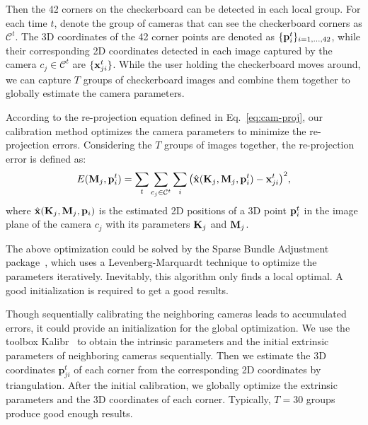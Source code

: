 %
Then the 42 corners on the checkerboard can be detected in each local group.
%
For each time $t$, denote the group of cameras that can see the checkerboard corners as $\mathcal{C}^t$. The 3D coordinates of the 42 corner points are denoted as $\{\mathbf{p}^{t}_{i}\}_{i=1,\ldots, 42}$, while their corresponding 2D coordinates detected in each image captured by the camera $c_j \in \mathcal{C}^{t}$ are $\{\mathbf{x}^{t}_{ji}\}$.
%
While the user holding the checkerboard moves around, we can capture $T$ groups of checkerboard images and combine them together to globally estimate the camera parameters.
%


According to the re-projection equation defined in Eq.~\ref{eq:cam-proj}, our calibration method optimizes the camera parameters to minimize the re-projection errors. Considering the $T$ groups of images together, the re-projection error is defined as:
%
\begin{equation} \label{eq:global-proj-error}
E(\mathbf{M}_{j},\mathbf{p}^{t}_{i})=\sum_{t}\sum_{c_j\in \mathcal{C}^{t}}\sum_{i} \big( \hat{\mathbf{x}}(\mathbf{K}_{j},\mathbf{M}_{j}, \mathbf{p}^{t}_{i})-\mathbf{x}^{t}_{ji} \big)^{2},
\end{equation}
%
where $\hat{\mathbf{x}}(\mathbf{K}_{j},\mathbf{M}_{j}, \mathbf{p}_{i})$ is the estimated 2D positions of a 3D point $\mathbf{p}^{t}_{i}$ in the image plane of the camera $c_j$ with its parameters $\mathbf{K}_j$ and $\mathbf{M}_j$.


The above optimization could be solved by the Sparse Bundle Adjustment package~\cite{lour09}, which uses a Levenberg-Marquardt technique to optimize the parameters iteratively.
Inevitably, this algorithm only finds a local optimal.
A good initialization is required to get a good results.


Though sequentially calibrating the neighboring cameras leads to accumulated errors, it could provide an initialization for the global optimization.
%
We use the toolbox Kalibr~\cite{Maye2013Self} to obtain the intrinsic parameters and the initial extrinsic parameters of neighboring cameras sequentially.
%
Then we estimate the 3D coordinates $\mathbf{p}^{t}_{ji}$ of each corner from the corresponding 2D coordinates by triangulation.
%
After the initial calibration, we globally optimize the extrinsic parameters and the 3D coordinates of each corner.
Typically, $T=30$ groups produce good enough results.

